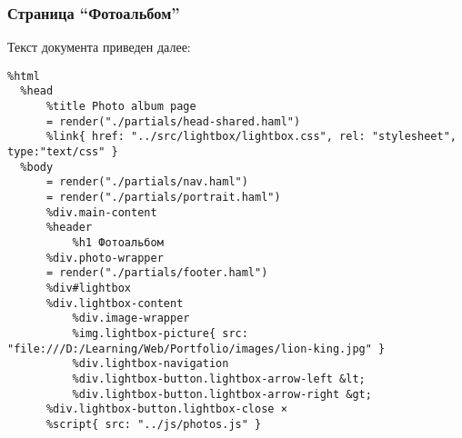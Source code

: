 \documentclass[a4paper,14pt]{extarticle}
\begin{document}
\subsubsection{Страница \enquote{Фотоальбом}}
Текст документа  приведен далее:
\begin{lstlisting}
%html
  %head
      %title Photo album page
      = render("./partials/head-shared.haml")
      %link{ href: "../src/lightbox/lightbox.css", rel: "stylesheet", type:"text/css" }
  %body
      = render("./partials/nav.haml")
      = render("./partials/portrait.haml")
      %div.main-content
      %header
          %h1 Фотоальбом
      %div.photo-wrapper
      = render("./partials/footer.haml")
      %div#lightbox
      %div.lightbox-content
          %div.image-wrapper
          %img.lightbox-picture{ src: "file:///D:/Learning/Web/Portfolio/images/lion-king.jpg" }
          %div.lightbox-navigation
          %div.lightbox-button.lightbox-arrow-left &lt;
          %div.lightbox-button.lightbox-arrow-right &gt;
      %div.lightbox-button.lightbox-close ×
      %script{ src: "../js/photos.js" }
\end{lstlisting}
\end{document}
